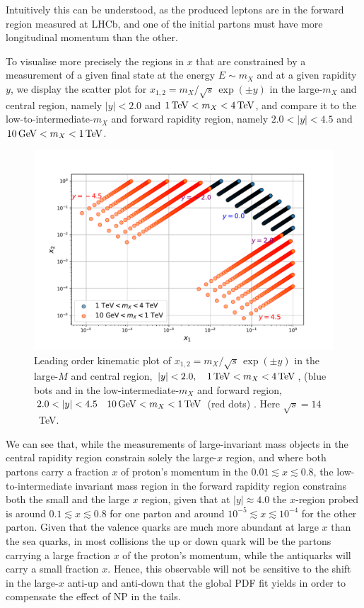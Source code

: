 \documentclass[withindex,glossary]{cam-thesis}
\begin{document}
%
Intuitively this can be understood, as the produced leptons are in the forward region measured at LHCb, and one of the initial 
partons must have more longitudinal momentum than the other. 

To visualise more precisely the regions in $x$ that are constrained by a measurement of a given final state at 
the energy $E\sim m_X$ and at a given rapidity $y$, we display the scatter plot for $x_{1,2} = m_X/\sqrt{s}\,\exp(\pm y)$ in the
large-$m_X$ and central region, namely $|y|<2.0$ and $1\,{\rm TeV}<m_X<4\,{\rm TeV}$, and compare it to the low-to-intermediate-$m_X$ 
and forward rapidity region, namely $2.0<|y|<4.5$ and $10\,{\rm GeV} < m_X < 1\,{\rm TeV}$.
%
\begin{figure}[H]
  \begin{center}
    \includegraphics[width=0.8\linewidth]{Figures/kin_plot.pdf}
    \end{center}
	\caption{Leading order kinematic plot of $x_{1,2} = m_X/\sqrt{s}\,\exp(\pm y)$ in the
large-$M$ and central region, $|y|<2.0,\quad 1\,{\rm TeV}<m_X<4\,{\rm TeV}$, (blue bots and in the low-intermediate-$m_X$ and forward region, $2.0<|y|<4.5\quad 10\,{\rm GeV} < m_X < 1\,{\rm TeV}$ (red dots) . Here $\sqrt{s}=14$~TeV.}
        \label{fig:kinplot}
\end{figure}
%
We can see that, while the measurements of large-invariant mass objects in the central rapidity region constrain solely the large-$x$ region, and
where both partons carry a fraction $x$ of proton's momentum in the $0.01\lesssim x \lesssim 0.8$, the low-to-intermediate invariant
mass region in the forward rapidity region constrains both the small and the large $x$ region, given that at $|y|\approx 4.0$ the $x$-region
probed is around $0.1\lesssim x \lesssim 0.8$ for one parton and around $10^{-5}\lesssim x \lesssim 10^{-4}$ for the other parton. 
Given that the valence quarks are much more abundant 
at large $x$ than the sea quarks, in most collisions the up or down quark will be the partons carrying a large fraction $x$ of the proton's momentum, 
while the antiquarks will carry a small fraction $x$. Hence, this observable will not be sensitive to the shift in the large-$x$ anti-up and 
anti-down that the global PDF fit yields in order to compensate the effect of NP in the tails. 
\end{document}
